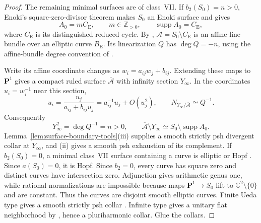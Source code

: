\documentclass[11pt]{amsart}
\theoremstyle{definition}
\theoremstyle{remark}
\numberwithin{equation}{section}
\newcommand{\C}{\mathbb C}
\newcommand{\PP}{\mathbf P}
\newcommand{\supp}{\operatorname{supp}}
\begin{document}
\begin{proof}
The remaining minimal surfaces are of class~VII. If $b_2(S_0)=n>0$, Enoki's
square-zero-divisor theorem \cite[Main Theorem, p.~454]{Enoki}
makes $S_0$ an Enoki surface and gives
\[
 A_0=mC_{\mathrm E},\qquad m\in\mathbb Z_{>0},
 \qquad \supp A_0=C_{\mathrm E},
\]
where $C_{\mathrm E}$ is its distinguished reduced cycle. By
\cite[Proposition~3.5\textup{(iii)}, p.~460]{Enoki},
$\mathcal A=S_0\setminus C_{\mathrm E}$ is an affine-line bundle
over an elliptic curve $B_{\mathrm E}$. Its linearization $Q$ has
$\deg Q=-n$, using the affine-bundle degree convention of
\cite[\S2, p.~457]{Enoki}.

Write its affine coordinate changes as
$w_i=a_{ij}w_j+b_{ij}$. Extending these maps to $\PP^1$ gives
a compact ruled surface $\overline{\mathcal A}$ with infinity
section $Y_\infty$. In the coordinates $u_i=w_i^{-1}$ near this
section,
\[
 u_i=\frac{u_j}{a_{ij}+b_{ij}u_j}
     =a_{ij}^{-1}u_j+O(u_j^2),\qquad
 N_{Y_\infty/\overline{\mathcal A}}\simeq Q^{-1}.
\]
Consequently
\[
 Y_\infty^2=\deg Q^{-1}=n>0,\qquad
 \overline{\mathcal A}\setminus Y_\infty
 \simeq S_0\setminus\supp A_0.
\]
Lemma~\ref{lem:surface-boundary-tools}\textup{(iii)} supplies a
smooth strictly psh divergent collar at $Y_\infty$, and
\textup{(ii)} gives a smooth psh exhaustion of its complement.
If $b_2(S_0)=0$, a minimal class~VII surface containing a curve is
elliptic or Hopf \cite[p.~453]{Enoki}. Since $a(S_0)=0$, it is Hopf.
Since $b_2=0$, every curve has square zero and distinct curves have
intersection zero. Adjunction gives arithmetic genus one, while
rational normalizations are impossible because maps
$\PP^1\to S_0$ lift to $\C^2\setminus\{0\}$ and are constant.
Thus the curves are disjoint smooth elliptic curves.
Finite Ueda type gives a smooth strictly psh collar
\cite[Theorem~2.5]{CLPT2018}. Infinite type gives a unitary flat
neighborhood by \cite[Theorem~1.6]{CFSTZ2026}, hence a
pluriharmonic collar. Glue the collars.
\end{proof}
\end{document}
